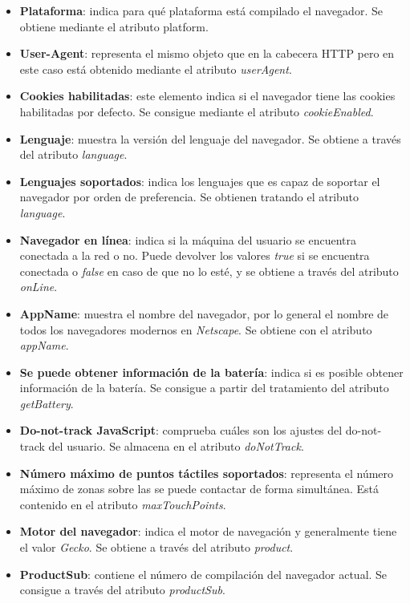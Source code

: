 \begin{itemize}
    \item \textbf{Plataforma}: indica para qué plataforma está compilado el navegador. Se obtiene mediante el atributo platform.
    \item \textbf{User-Agent}: representa el mismo objeto que en la cabecera HTTP pero en este caso está obtenido mediante el atributo \textit{userAgent}.
    \item \textbf{Cookies habilitadas}: este elemento indica si el navegador tiene las cookies habilitadas por defecto. Se consigue mediante el atributo \textit{cookieEnabled}.
    \item \textbf{Lenguaje}: muestra la versión del lenguaje del navegador. Se obtiene a través del atributo \textit{language}. 
    \item \textbf{Lenguajes soportados}: indica los lenguajes que es capaz de soportar el navegador por orden de preferencia. Se obtienen tratando el atributo \textit{language}. 
    \item \textbf{Navegador en línea}: indica si la máquina del usuario se encuentra conectada a la red o no. Puede devolver los valores \textit{true} si se encuentra conectada o \textit{false} en caso de que no lo esté, y se obtiene a través del atributo \textit{onLine}.
    \item \textbf{AppName}: muestra el nombre del navegador, por lo general el nombre de todos los navegadores modernos en \textit{Netscape}. Se obtiene con el atributo \textit{appName}.
    \item \textbf{Se puede obtener información de la batería}: indica si es posible obtener información de la batería. Se consigue a partir del tratamiento del atributo \textit{getBattery}. 
    \item \textbf{Do-not-track JavaScript}: comprueba cuáles son los ajustes del do-not-track del usuario. Se almacena en el atributo \textit{doNotTrack}. 
    \item \textbf{Número máximo de puntos táctiles soportados}: representa el número máximo de zonas sobre las se puede contactar de forma simultánea. Está contenido en el atributo \textit{maxTouchPoints}. 
    \item \textbf{Motor del navegador}: indica el motor de navegación y generalmente tiene el valor \textit{Gecko}. Se obtiene a través del atributo \textit{product}. 
    \item \textbf{ProductSub}: contiene el número de compilación del navegador actual. Se consigue a través del atributo \textit{productSub}. 

\end{itemize}
